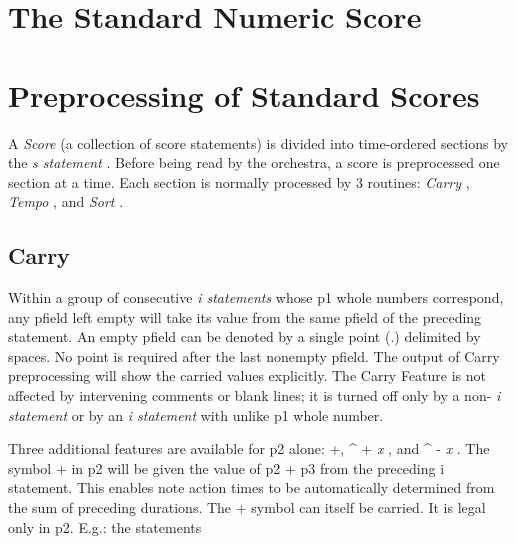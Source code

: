 \begin{comment}
\documentclass[10pt]{article}
\usepackage{fullpage, graphicx, url}
\setlength{\parskip}{1ex}
\setlength{\parindent}{0ex}
\title{The Standard Numeric Score}



\begin{tabular}{ccc}
The Alternative Csound Reference Manual & & \\
Previous & &Next

\end{tabular}

\end{comment}
\section{The Standard Numeric Score}
\section{Preprocessing of Standard Scores}


  A \emph{Score}
 (a collection of score statements) is divided into time-ordered sections by the \emph{s statement}
. Before being read by the orchestra, a score is preprocessed one section at a time. Each section is normally processed by 3 routines: \emph{Carry}
, \emph{Tempo}
, and \emph{Sort}
. 
\subsection*{Carry}


  Within a group of consecutive \emph{i statements}
 whose p1 whole numbers correspond, any pfield left empty will take its value from the same pfield of the preceding statement. An empty pfield can be denoted by a single point (.) delimited by spaces. No point is required after the last nonempty pfield. The output of Carry preprocessing will show the carried values explicitly. The Carry Feature is not affected by intervening comments or blank lines; it is turned off only by a non- \emph{i statement}
 or by an \emph{i statement}
 with unlike p1 whole number. 


  Three additional features are available for p2 alone: +, \^{} + \emph{x}
, and \^{} - \emph{x}
. The symbol + in p2 will be given the value of p2 + p3 from the preceding i statement. This enables note action times to be automatically determined from the sum of preceding durations. The + symbol can itself be carried. It is legal only in p2. E.g.: the statements 


